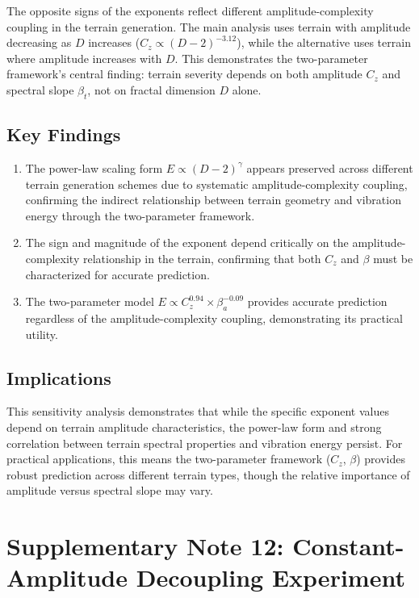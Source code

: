 \documentclass[11pt]{article}
\begin{document}
The opposite signs of the exponents reflect different amplitude-complexity coupling in the terrain generation. The main analysis uses terrain with amplitude decreasing as $D$ increases ($C_z \propto (D-2)^{-3.12}$), while the alternative uses terrain where amplitude increases with $D$. This demonstrates the two-parameter framework's central finding: terrain severity depends on both amplitude $C_z$ and spectral slope $\beta_t$, not on fractal dimension $D$ alone.

\subsection{Key Findings}

\begin{enumerate}
\item The power-law scaling form $E \propto (D-2)^\gamma$ appears preserved across different terrain generation schemes due to systematic amplitude-complexity coupling, confirming the indirect relationship between terrain geometry and vibration energy through the two-parameter framework.

\item The sign and magnitude of the exponent depend critically on the amplitude-complexity relationship in the terrain, confirming that both $C_z$ and $\beta$ must be characterized for accurate prediction.

\item The two-parameter model $E \propto C_z^{0.94} \times \beta_a^{-0.09}$ provides accurate prediction regardless of the amplitude-complexity coupling, demonstrating its practical utility.
\end{enumerate}

\subsection{Implications}

This sensitivity analysis demonstrates that while the specific exponent values depend on terrain amplitude characteristics, the power-law form and strong correlation between terrain spectral properties and vibration energy persist. For practical applications, this means the two-parameter framework ($C_z$, $\beta$) provides robust prediction across different terrain types, though the relative importance of amplitude versus spectral slope may vary.


\section{Supplementary Note 12: Constant-Amplitude Decoupling Experiment}
\end{document}
